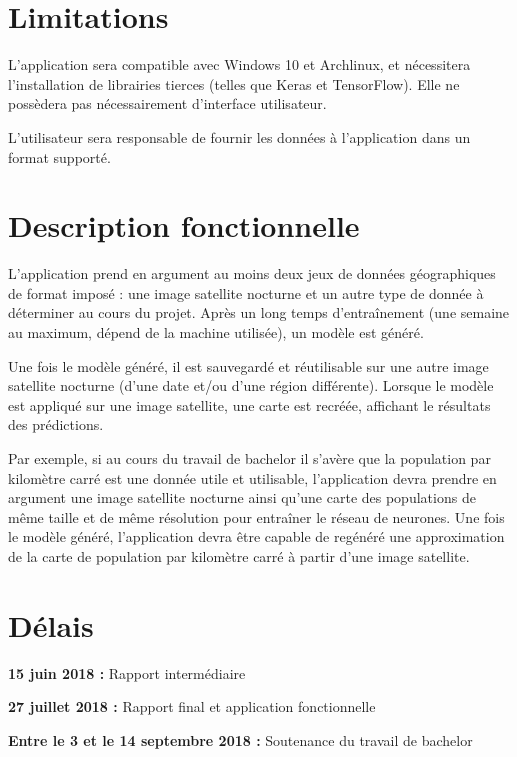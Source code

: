 \documentclass[a4paper]{report}
\begin{document}
\section{Limitations}
L'application sera compatible avec Windows 10 et Archlinux, et nécessitera l'installation de librairies tierces (telles que Keras et TensorFlow).
Elle ne possèdera pas nécessairement d'interface utilisateur.

L'utilisateur sera responsable de fournir les données à l'application dans un format supporté.

\section{Description fonctionnelle}
L'application prend en argument au moins deux jeux de données géographiques de format imposé : une image satellite nocturne et un autre type de donnée à déterminer au cours du projet. Après un long temps d'entraînement (une semaine au maximum, dépend de la machine utilisée), un modèle est généré.

Une fois le modèle généré, il est sauvegardé et réutilisable sur une autre image satellite nocturne (d'une date et/ou d'une région différente). Lorsque le modèle est appliqué sur une image satellite, une carte est recréée, affichant le résultats des prédictions.

Par exemple, si au cours du travail de bachelor il s'avère que la population par kilomètre carré est une donnée utile et utilisable, l'application devra prendre en argument une image satellite nocturne ainsi qu'une carte des populations de même taille et de même résolution pour entraîner le réseau de neurones. Une fois le modèle généré, l'application devra être capable de regénéré une approximation de la carte de population par kilomètre carré à partir d'une image satellite.

\section{Délais}
\textbf{15 juin 2018 :} Rapport intermédiaire

\textbf{27 juillet 2018 :} Rapport final et application fonctionnelle

\textbf{Entre le 3 et le 14 septembre 2018 :} Soutenance du travail de bachelor

\end{document}
